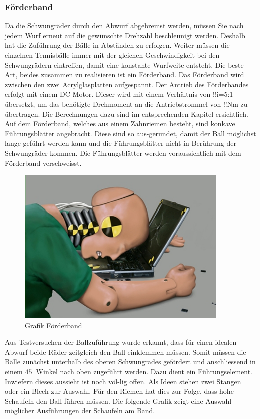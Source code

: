 \subsubsection{Förderband}
Da die Schwungräder durch den Abwurf abgebremst werden, müssen Sie nach jedem Wurf erneut auf die gewünschte Drehzahl beschleunigt werden. Deshalb hat die Zuführung der Bälle in Abständen zu erfolgen. Weiter müssen die einzelnen Tennisbälle immer mit der gleichen Geschwindigkeit bei den Schwungrädern eintreffen, damit eine konstante Wurfweite entsteht. Die beste Art, beides zusammen zu realisieren ist ein Förderband. Das Förderband wird zwischen den zwei Acrylglasplatten aufgespannt. Der Antrieb des Förderbandes erfolgt mit einem DC-Motor. Dieser wird mit einem Verhältnis von !!i=5:1 übersetzt, um das benötigte Drehmoment an die Antriebstrommel von !!Nm zu übertragen. Die Berechnungen dazu sind im entsprechenden Kapitel ersichtlich. Auf dem Förderband, welches aus einem Zahnriemen besteht, sind konkave Führungsblätter angebracht. Diese sind so aus-gerundet, damit der Ball möglichst lange geführt werden kann und die Führungsblätter nicht in Berührung der Schwungräder kommen. Die Führungsblätter werden voraussichtlich mit dem Förderband verschweisst.
\begin{figure}
	\centering
	\includegraphics[width=0.9\textwidth]{Enddokumentation/CrashTestDummy.jpg}
	\caption{Grafik Förderband}
	\label{fig:Grafik Förderband}	
\end{figure}
Aus Testversuchen der Ballzuführung wurde erkannt, dass für einen idealen Abwurf beide Räder zeitgleich den Ball einklemmen müssen. Somit müssen die Bälle zunächst unterhalb des oberen Schwungrades gefördert und anschliessend in einem $45^\cdot$ Winkel nach oben zugeführt werden. Dazu dient ein Führungselement. Inwiefern dieses aussieht ist noch völ-lig offen. Als Ideen stehen zwei Stangen oder ein Blech zur Auswahl. Für den Riemen hat dies zur Folge, dass hohe Schaufeln den Ball führen müssen. Die folgende Grafik zeigt eine Auswahl möglicher Ausführungen der Schaufeln am Band.
